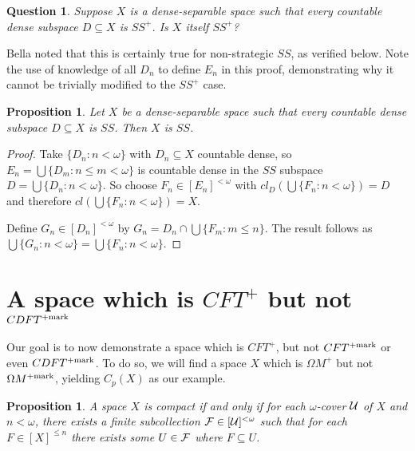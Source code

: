 \documentclass{amsart}
\theoremstyle{plain}
\newtheorem{proposition}[theorem]{Proposition}
\newtheorem{question}[theorem]{Question}
\theoremstyle{definition}
\theoremstyle{remark}
\theoremstyle{plain}
\theoremstyle{definition}
\theoremstyle{remark}
\begin{document}
\begin{question}
  Suppose \(X\) is a dense-separable space such that every countable dense
  subspace \(D\subseteq X\) is \(SS^+\). Is \(X\) itself \(SS^+\)?
\end{question}

Bella noted that this is certainly true for non-strategic \(SS\),
as verified below. Note the use of knowledge of all \(D_n\) 
to define \(E_n\) in this proof,
demonstrating why it cannot be trivially modified to the \(SS^+\) case.

\begin{proposition}
  Let \(X\) be a dense-separable space such that every countable dense
  subspace \(D\subseteq X\) is \(SS\). Then \(X\) is \(SS\).
\end{proposition}

\begin{proof}
  Take \(\{D_n:n<\omega\}\) with \(D_n\subseteq X\) countable dense,
  so \(E_n=\bigcup\{D_m:n\leq m<\omega\}\) is countable dense in
  the \(SS\) subspace \(D=\bigcup\{D_n:n<\omega\}\). So choose \(F_n\in[E_n]^{<\omega}\)
  with \(cl_D(\bigcup\{F_n:n<\omega\})=D\) and therefore 
  \(cl(\bigcup\{F_n:n<\omega\})=X\).

  Define \(G_n\in[D_n]^{<\omega}\) by \(G_n=D_n\cap\bigcup\{F_m:m\leq n\}\).
  The result follows as \(\bigcup\{G_n:n<\omega\}=\bigcup\{F_n:n<\omega\}\).
\end{proof} 

\section{A space which is \(CFT^+\) but not \(CDFT^{+\mathrm{mark}}\)}

Our goal is to now demonstrate a space which is \(CFT^+\),
but not \(CFT^{+\mathrm{mark}}\) or even \(CDFT^{+\mathrm{mark}}\).
To do so, we will find a space \(X\)
which is \(\Omega M^+\) but not \(\Omega M^{+\mathrm{mark}}\), yielding \(C_p(X)\)
as our example.

\begin{proposition}\label{altCompactCharacterization}
  A space \(X\) is compact if and only if for each \(\omega\)-cover
  \(\mathcal{U}\) of \(X\) and \(n<\omega\), there exists a finite subcollection
  \(\mathcal{F}\in[\mathcal{U}]^{<\omega}\) such that for each \(F\in[X]^{\leq n}\)
  there exists some \(U\in\mathcal{F}\) where \(F\subseteq U\).
\end{proposition}
\end{document}
